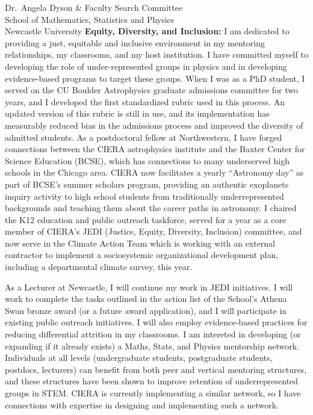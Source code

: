 \documentclass[12pt, a4paper]{letter}
\begin{document}
\begin{letter}{
        Dr.~Angela Dyson \& Faculty Search Committee \\
        School of Mathematics, Statistics and Physics \\
        Newcastle University}
    \textbf{Equity, Diversity, and Inclusion:} I am dedicated to providing a just, equitable and inclusive environment in my mentoring relationships, my classrooms, and my host institution.
    I have committed myself to developing the role of under-represented groups in physics and in developing evidence-based programs to target these groups.
    When I was as a PhD student, I served on the CU Boulder Astrophysics graduate admissions committee for two years, and I developed the first standardized rubric used in this process.
    An updated version of this rubric is still in use, and its implementation has measurably reduced bias in the admissions process and improved the diversity of admitted students.
    As a postdoctoral fellow at Northwestern, I have forged connections between the CIERA astrophysics institute and the Baxter Center for Science Education (BCSE), which has connections to many underserved high schools in the Chicago area.
    CIERA now facilitates a yearly ``Astronomy day'' as part of BCSE's summer scholars program, providing an authentic exoplanets inquiry activity to high school students from traditionally underrepresented backgrounds and teaching them about the career paths in astronomy.
    I chaired the K12 education and public outreach taskforce, served for a year as a core member of CIERA's JEDI (Justice, Equity, Diversity, Inclusion) committee, and now serve in the Climate Action Team which is working with an external contractor to implement a sociosystemic organizational development plan, including a departmental climate survey, this year.

    As a Lecturer at Newcastle, I will continue my work in JEDI initiatives.
    I will work to complete the tasks outlined in the action list of the School's Athena Swan bronze award (or a future award application), and I will participate in existing public outreach initiatives.
    I will also employ evidence-based practices for reducing differential attrition in my classrooms. 
    I am intereted in developing (or expanding if it already exists) a Maths, Stats, and Physics mentorship network.
    Individuals at all levels (undergraduate students, postgraduate students, postdocs, lecturers) can benefit from both peer and vertical mentoring structures, and these structures have been shown to improve retention of underrepresented groups in STEM.
    CIERA is currently implementing a similar network, so I have connections with expertise in designing and implementing such a network.




\end{letter}
\end{document}
